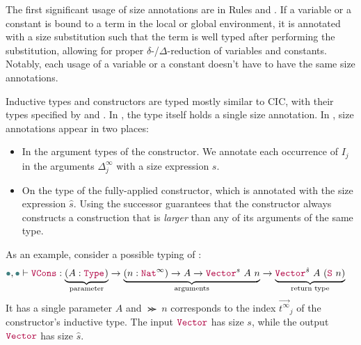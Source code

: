 The first significant usage of size annotations are in Rules  and .
If a variable or a constant is bound to a term in the local or global environment, it is annotated with a size substitution such that the term is well typed after performing the substitution, allowing for proper $\delta$-/$\Delta$-reduction of variables and constants.
Notably, each usage of a variable or a constant doesn't have to have the same size annotations.

Inductive types and constructors are typed mostly similar to CIC,
with their types specified by \indtype and \constrtype.
In , the \coinductive type itself holds a single size annotation.
In , size annotations appear in two places:
\begin{itemize}
    \item In the argument types of the constructor.
      We annotate each occurrence of $I_j$ in the arguments $\Delta^\infty_j$ with a size expression $s$.
    \item On the \coinductive type of the fully-applied constructor,
      which is annotated with the size expression $\hat{s}$.
      Using the successor guarantees that the constructor always constructs a construction that is \textit{larger} than any of its arguments of the same type.
\end{itemize}
As an example, consider a possible typing of :
\begin{align*}
\mt, \mt \vdash \VCons &: \underbrace{(A: \Type{})}_{\text{parameter}} \to \underbrace{(n:\Nat^\infty) \to A \to \Vector^s ~ A ~ n}_{\text{arguments}} \to \underbrace{\Vector^{\hat{s}} ~ A ~ (\Succ ~ n)}_{\text{return type}}
\end{align*}
It has a single parameter $A$ and $\Succ ~ n$ corresponds to the index $\vec{t^\infty}_j$ of the constructor's inductive type.
The input $\Vector$ has size $s$, while the output $\Vector$ has size $\hat{s}$.

